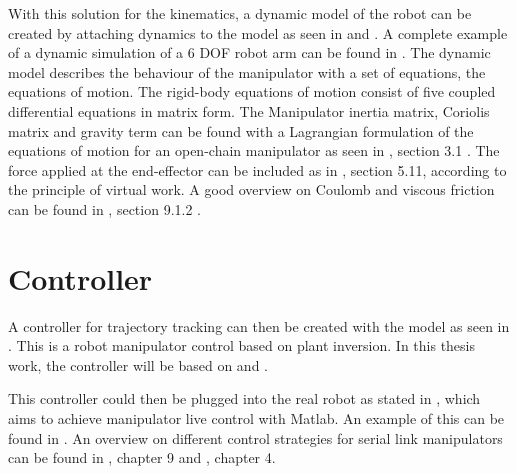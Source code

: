 With this solution for the kinematics, a dynamic model of the robot can be created by attaching dynamics to the model as seen in %
\cite{KongWei} and %
\cite{MathIntroRobManip}. A complete example of a dynamic simulation of a 6 \ac{DOF} robot arm can be found in %
\cite{CorkeRoboticVisionControl}.
The dynamic model describes the behaviour of the manipulator with a set of equations, the equations of motion.
The rigid-body equations of motion consist of five coupled differential equations in matrix form.
The Manipulator inertia matrix, Coriolis matrix and gravity term can be found with a Lagrangian formulation of the equations of motion for an open-chain manipulator as seen in %
\cite{MathIntroRobManip}, section 3.1%
. The force applied at the end-effector can be included as in %
\cite{IndustrialRobotArm}, section 5.11, according to the principle of virtual work. A good overview on Coulomb and viscous friction can be found in \cite{CorkeRoboticVisionControl}, %
section 9.1.2 %
. 
\medskip

\section{Controller}

A controller for trajectory tracking can then be created with the model as seen in %
\cite{evalNonlinFeedForBackControl}. %
This is a robot manipulator control based on plant inversion. In this thesis work, the controller will be based on \cite{CorkeRoboticVisionControl} and \cite{MathIntroRobManip}.

This controller could then be plugged into the real robot as stated in %
\cite{FANUCcontrolMatlab}, which aims%
to achieve manipulator live control with Matlab. An example of this can be found in %
\cite{RobotModelAnalContrexampleJamshed}.
An overview on different control strategies for serial link manipulators can be found in \cite{CorkeRoboticVisionControl}, chapter 9 and \cite{MathIntroRobManip}, chapter 4.
\bigskip


























